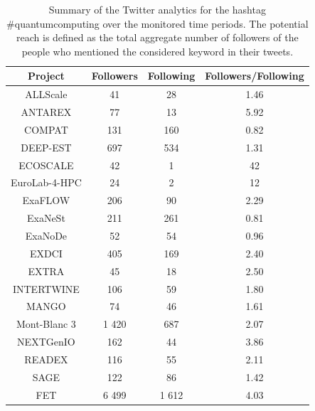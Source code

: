 \begin{table}[t]
 \begin{center}
 {\scriptsize
  \begin{tabular}{cccc}
   \hline 
   \hline
   Project & Followers & Following & Followers/Following \\ 
   \hline
   \hline
   ALLScale & 41 & 28 & 1.46 \\
   ANTAREX & 77 & 13 & 5.92 \\
   COMPAT & 131 & 160 & 0.82 \\
   DEEP-EST & 697 & 534 & 1.31 \\
   ECOSCALE & 42 & 1 & 42 \\
   EuroLab-4-HPC & 24 & 2 & 12 \\
   ExaFLOW & 206 & 90 & 2.29 \\
   ExaNeSt & 211 & 261 & 0.81  \\
   ExaNoDe & 52 & 54 & 0.96 \\
   EXDCI & 405 & 169 & 2.40 \\
   EXTRA & 45 & 18 & 2.50\\
   INTERTWINE & 106 & 59 & 1.80 \\
   MANGO & 74 & 46 & 1.61 \\
   Mont-Blanc 3 & 1 420 & 687 & 2.07 \\
   NEXTGenIO & 162 & 44 & 3.86 \\
   READEX & 116 & 55 & 2.11 \\
   SAGE & 122 & 86 & 1.42 \\ 
   FET & 6 499 & 1 612 & 4.03 \\
   \hline
   \hline
  \end{tabular}
 } 
 \end{center} 
 \caption{Summary of the Twitter analytics for the hashtag \#quantumcomputing over the monitored time periods. The potential reach is defined as the total aggregate number of followers of the people who mentioned the considered keyword in their tweets.}
\label{HPC_influence_table} 
\end{table}

